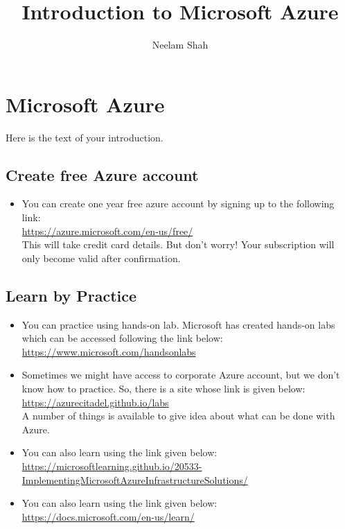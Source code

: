 \documentclass{article}
\begin{document}
\title{Introduction to Microsoft Azure{}}
\author{Neelam Shah}

\maketitle

\section{Microsoft Azure}
Here is the text of your introduction.



\subsection{Create free Azure account}
\begin{itemize}
	\item You can create one year free azure account by signing up to the following link: \\
	\url{https://azure.microsoft.com/en-us/free/}\\
	This will take credit card details. But don't worry! Your subscription will only become valid after confirmation.
\end{itemize}

\subsection{Learn by Practice}
\begin{itemize}
	\item You can practice using hands-on lab. Microsoft has created hands-on labs which can be accessed following the link below: \\
	\url{https://www.microsoft.com/handsonlabs}\\
	
	\item Sometimes we might have access to corporate Azure account, but we don't know how to practice. So, there is a site whose link is given below:\\
	\url{https://azurecitadel.github.io/labs}\\
	A number of things is available to give idea about what can be done with Azure.
	
	\item You can also learn using the link given below:\\
	\url{https://microsoftlearning.github.io/20533-ImplementingMicrosoftAzureInfrastructureSolutions/}\\
	
	\item You can also learn using the link given below:\\
	\url{https://docs.microsoft.com/en-us/learn/}
\end{itemize}
\end{document}

